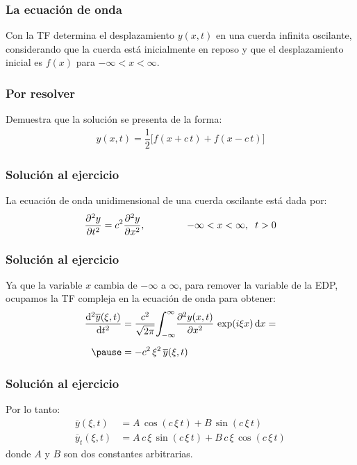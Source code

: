 \begin{frame}
\frametitle{La ecuación de onda}
Con la TF determina el desplazamiento $y (x, t)$ en una cuerda infinita oscilante, \pause considerando que la cuerda está inicialmente en reposo y que el desplazamiento inicial es $f (x)$ para $-\infty < x < \infty$.
\end{frame}
\begin{frame}
\frametitle{Por resolver}
Demuestra que la solución se presenta de la forma:
\pause
\begin{align*}
y (x, t) = \dfrac{1}{2} \big[ f (x + c \, t) + f (x - c \, t) \big]
\end{align*}
\end{frame}
\begin{frame}
\frametitle{Solución al ejercicio}
La ecuación de onda unidimensional de una cuerda oscilante está dada por:
\pause
\begin{align*}
\pdv[2]{y}{t} = c^{2} \pdv[2]{y}{x}, \hspace{1.5cm} -\infty < x < \infty, \hspace{0.2cm} t > 0
\end{align*}
\end{frame}
\begin{frame}
\frametitle{Solución al ejercicio}
Ya que la variable $x$ cambia de $-\infty$ a $\infty$, para remover la variable de la EDP, \pause ocupamos la TF compleja en la ecuación de onda para obtener:
\pause
\begin{eqnarray*}
\begin{aligned}
\dv[2]{\overline{y}(\xi, t)}{t} &= \dfrac{c^{2}}{\sqrt{2 \pi}} \scaleint{6ex}_{\bs -\infty}^{\infty} \pdv[2]{y(x, t)}{x} \, \exp(i \xi x) \dd{x} = \\[0.5em] \pause
&= - c^{2} \, \xi^{2} \, \overline{y} (\xi, t)
\end{aligned}
\end{eqnarray*}
\end{frame}
\begin{frame}
\frametitle{Solución al ejercicio}
Por lo tanto:
\pause
\begin{align}
\overline{y} (\xi, t) &= A \, \cos (c \, \xi \, t) + B \, \sin (c \, \xi \, t) \label{eq:ecuacion_ejemplo_1_29_i} \\[0.5em]
\overline{y}_{t} (\xi, t) &= A \, c \, \xi \, \sin (c \, \xi \, t) + B \, c \, \xi \, \cos (c \, \xi \, t) \label{eq:ecuacion_ejemplo_1_29_ii}
\end{align}
donde $A$ y $B$ son dos constantes arbitrarias.
\end{frame}
